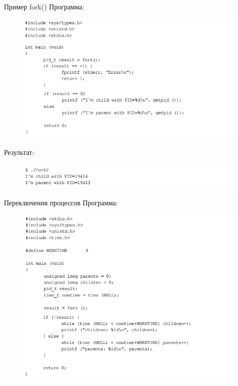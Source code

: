 \documentclass{beamer}
\begin{document}
\begin{frame}{Пример fork()}
Программа:
\begin{figure}[h]
\centering
\includegraphics[scale=0.5]{images/lec07-pic33.png}
\end{figure}
Результат:
\begin{figure}[h]
\centering
\includegraphics[scale=0.5]{images/lec07-pic34.png}
\end{figure}
\end{frame}

\begin{frame}{Переключения процессов}
Программа:
\begin{figure}[h]
\centering
\includegraphics[scale=0.5]{images/lec07-pic35.png}
\end{figure}
\end{frame}
\end{document}
